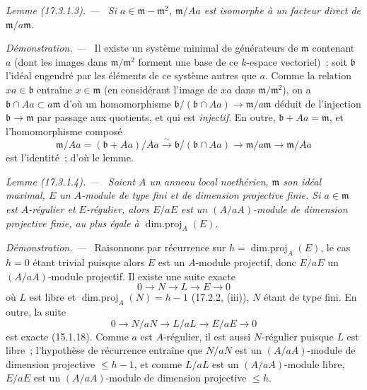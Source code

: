 \documentclass[10pt,oneside]{book}
\makeatletter
\newcommand{\setmanualcurrentlabel}[1]{\def\@currentlabel{#1}}
\newenvironment{lemma}[1][]{%
  \setmanualcurrentlabel{#1}\par\medskip\noindent\itshape Lemme (#1). ---\ }{\par}
\newenvironment{proof}{%
  \par\medskip\noindent\textit{Démonstration. ---\ }}{\par}
\makeatother
\begin{document}
\begin{lemma}[17.3.1.3]
\label{0.17.3.1.3-fr}
Si $a\in\mathfrak{m}-\mathfrak{m}^2$, $\mathfrak{m}/Aa$ est isomorphe à un
facteur direct de $\mathfrak{m}/a\mathfrak{m}$.
\end{lemma}

\begin{proof}
Il existe un système minimal de générateurs de $\mathfrak{m}$ contenant $a$
(dont les images dans $\mathfrak{m}/\mathfrak{m}^2$ forment une base de ce
$k$-espace vectoriel)~; soit $\mathfrak{b}$ l'idéal engendré par les éléments
de ce système autres que $a$. Comme la relation $xa\in\mathfrak{b}$ entraîne
$x\in\mathfrak{m}$ (en considérant l'image de $xa$ dans
$\mathfrak{m}/\mathfrak{m}^2$), on a
$\mathfrak{b}\cap Aa\subset a\mathfrak{m}$ d'où un homomorphisme
$\mathfrak{b}/(\mathfrak{b}\cap Aa)\longrightarrow
\mathfrak{m}/a\mathfrak{m}$ déduit de l'injection
$\mathfrak{b}\longrightarrow\mathfrak{m}$ par passage aux quotients, et qui
est \emph{injectif}. En outre, $\mathfrak{b}+Aa=\mathfrak{m}$, et
l'homomorphisme composé
\[
  \mathfrak{m}/Aa=(\mathfrak{b}+Aa)/Aa
  \xrightarrow{\sim}\mathfrak{b}/(\mathfrak{b}\cap Aa)
  \longrightarrow\mathfrak{m}/a\mathfrak{m}
  \longrightarrow\mathfrak{m}/Aa
\]
est l'identité~; d'où le lemme.
\end{proof}

\begin{lemma}[17.3.1.4]
\label{0.17.3.1.4-fr}
Soient $A$ un anneau local noethérien, $\mathfrak{m}$ son idéal maximal, $E$
un $A$-module de type fini et de dimension projective finie. Si
$a\in\mathfrak{m}$ est $A$-régulier et $E$-régulier, alors $E/aE$ est un
$(A/aA)$-module de dimension projective finie, au plus égale à
$\operatorname{dim.proj}_A(E)$.
\end{lemma}

\begin{proof}
Raisonnons par récurrence sur $h=\operatorname{dim.proj}_A(E)$, le cas $h=0$
étant trivial puisque alors $E$ est un $A$-module projectif, donc $E/aE$ un
$(A/aA)$-module projectif. Il existe une suite exacte
\[
  0\longrightarrow N\longrightarrow L\longrightarrow E\longrightarrow0
\]
où $L$ est libre et $\operatorname{dim.proj}_A(N)=h-1$ (17.2.2, (iii)), $N$
étant de type fini. En outre, la suite
\[
  0\longrightarrow N/aN\longrightarrow L/aL\longrightarrow E/aE
  \longrightarrow0
\]
est exacte (15.1.18). Comme $a$ est $A$-régulier, il est aussi $N$-régulier
puisque $L$ est libre~; l'hypothèse de récurrence entraîne que $N/aN$ est un
$(A/aA)$-module de dimension projective $\leq h-1$, et comme $L/aL$ est un
$(A/aA)$-module libre, $E/aE$ est un $(A/aA)$-module de dimension projective
$\leq h$.
\end{proof}
\end{document}
